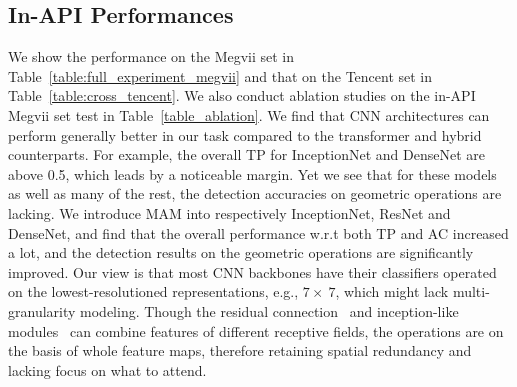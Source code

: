 \documentclass[sigconf]{acmart}
\begin{document}
\subsection{In-API Performances}
We show the performance on the Megvii set in Table~\ref{table:full_experiment_megvii} and that on the Tencent set in Table~\ref{table:cross_tencent}. We also conduct ablation studies on the in-API Megvii set test in Table~\ref{table_ablation}.
We find that CNN architectures can perform generally better in our task compared to the transformer and hybrid counterparts.
For example, the overall TP for InceptionNet and DenseNet are above 0.5, which leads by a noticeable margin.
Yet we see that for these models as well as many of the rest, the detection accuracies on geometric operations are lacking.
We introduce MAM into respectively InceptionNet, ResNet and DenseNet, and find that the overall performance w.r.t both TP and AC increased a lot, and the detection results on the geometric operations are significantly improved.
Our view is that most CNN backbones have their classifiers operated on the lowest-resolutioned representations, e.g., $7\times~7$, which might lack multi-granularity modeling.
Though the residual connection~\cite{ResNetv2} and inception-like modules~\cite{inceptionv2} can combine features of different receptive fields, the operations are on the basis of whole feature maps, therefore retaining spatial redundancy and lacking focus on what to attend. 
\end{document}
